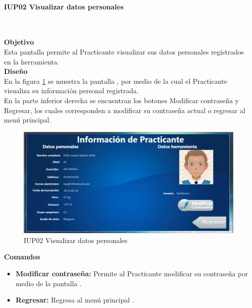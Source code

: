 \paragraph{IUP02 Visualizar datos personales} \hspace{1cm}\\ 
\label{pant:IUP02} 

\textbf{\textcolor[rgb]{0, 0, 0.545098}{Objetivo}}\\
Esta pantalla permite al Practicante visualizar sus datos personales registrados en la herramienta.\\

\textbf{\textcolor[rgb]{0, 0, 0.545098}{Diseño}}\\
En la figura \ref{fig:IUP02} se muestra la pantalla , por medio de la cual el Practicante visualiza su información personal registrada. \\

En la parte inferior derecha se encuentran los botones Modificar contraseña y Regresar, los cuales corresponden a modificar su contraseña actual o regresar al menú principal.

\begin{figure}[H]
	\centering
		\includegraphics[scale=0.5]{./Figuras/Pantallas/IUP02Visualizar_datos_personales}
	\caption{IUP02 Visualizar datos personales}
	\label{fig:IUP02}
\end{figure}

\textbf{\textcolor[rgb]{0, 0, 0.545098}{Comandos}}
\begin{itemize}
	\item \textbf{\textcolor[rgb]{0, 0, 0.545098}{Modificar contraseña:}} Permite al Practicante modificar su contraseña por medio de la pantalla . \\
	
	\item \textbf{\textcolor[rgb]{0, 0, 0.545098}{Regresar:}} Regresa al menú principal .\\
\end{itemize}

\clearpage